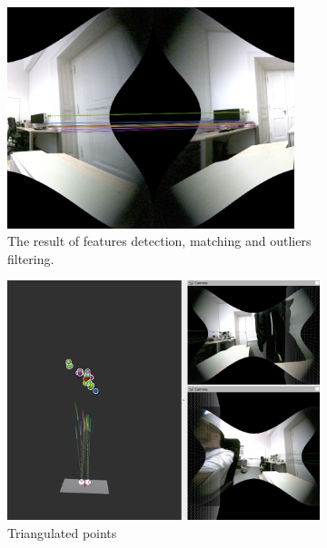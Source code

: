 \begin{figure}[h]
  \begin{subfigure}[h]{0.49\textwidth}
    \centering
    \includegraphics[width=0.92\textwidth]{graphics/corresp.png}
    \caption{The result of features detection, matching and outliers filtering.}
    \label{fig:corresp_life}
  \end{subfigure}
  \hfill
  \begin{subfigure}[h]{0.49\textwidth}
    \centering
    \includegraphics[width=\textwidth]{graphics/res_trangulation.png}
    \caption{Triangulated points}
    \label{fig:triang_life}
  \end{subfigure}
  \caption{}
  \label{fig:res}
\end{figure}


